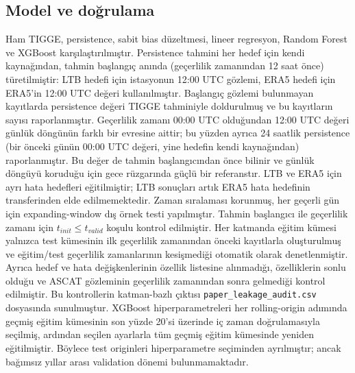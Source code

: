 \documentclass[11pt,a4paper]{article}
\begin{document}
\subsection{Model ve doğrulama}
Ham TIGGE, persistence, sabit bias düzeltmesi, lineer regresyon, Random Forest ve XGBoost karşılaştırılmıştır. Persistence tahmini her hedef için kendi kaynağından, tahmin başlangıç anında (geçerlilik zamanından 12 saat önce) türetilmiştir: LTB hedefi için istasyonun 12:00 UTC gözlemi, ERA5 hedefi için ERA5'in 12:00 UTC değeri kullanılmıştır. Başlangıç gözlemi bulunmayan kayıtlarda persistence değeri TIGGE tahminiyle doldurulmuş ve bu kayıtların sayısı raporlanmıştır. Geçerlilik zamanı 00:00 UTC olduğundan 12:00 UTC değeri günlük döngünün farklı bir evresine aittir; bu yüzden ayrıca 24 saatlik persistence (bir önceki günün 00:00 UTC değeri, yine hedefin kendi kaynağından) raporlanmıştır. Bu değer de tahmin başlangıcından önce bilinir ve günlük döngüyü koruduğu için gece rüzgarında güçlü bir referanstır. LTB ve ERA5 için ayrı hata hedefleri eğitilmiştir; LTB sonuçları artık ERA5 hata hedefinin transferinden elde edilmemektedir. Zaman sıralaması korunmuş, her geçerli gün için expanding-window dış örnek testi yapılmıştır. Tahmin başlangıcı ile geçerlilik zamanı için $t_{init}\le t_{valid}$ koşulu kontrol edilmiştir.
Her katmanda eğitim kümesi yalnızca test kümesinin ilk geçerlilik zamanından
önceki kayıtlarla oluşturulmuş ve eğitim/test geçerlilik zamanlarının
kesişmediği otomatik olarak denetlenmiştir. Ayrıca hedef ve hata değişkenlerinin
özellik listesine alınmadığı, özelliklerin sonlu olduğu ve ASCAT gözleminin
geçerlilik zamanından sonra gelmediği kontrol edilmiştir. Bu kontrollerin
katman-bazlı çıktısı \texttt{paper\_leakage\_audit.csv} dosyasında sunulmuştur. XGBoost
hiperparametreleri her rolling-origin adımında geçmiş eğitim kümesinin son
yüzde 20'si üzerinde iç zaman doğrulamasıyla seçilmiş, ardından seçilen
ayarlarla tüm geçmiş eğitim kümesinde yeniden eğitilmiştir. Böylece test
originleri hiperparametre seçiminden ayrılmıştır; ancak bağımsız yıllar arası
validation dönemi bulunmamaktadır.
\end{document}
